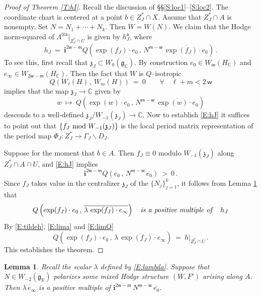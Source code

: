 \documentclass[12pt]{amsart}
\numberwithin{equation}{section}
\numberwithin{table}{section}
\def\sfa{\mathsf{a}}
\def\bC{\mathbb{C}}
\def\fg{\mathfrak{g}}
\def\bi{\mathbf{i}}
\def\sfm{\mathsf{m}}
\def\bR{\mathbb{R}}
\def\sfw{\mathsf{w}}
\def\bs{\backslash}
\def\ot{\otimes}
\newtheorem{lemma}[equation]{Lemma}
\theoremstyle{definition}
\theoremstyle{definition}
\theoremstyle{remark}
\def\bs{\backslash}
\def\fz{\mathfrak{z}}
\begin{document}
\begin{proof}[Proof of Theorem \ref{T:hI}]
Recall the discussion of \S\S\ref{S:loc1}--\ref{S:loc2}.  The coordinate chart is centered at a point $b \in Z_J^* \cap X$.  Assume that $Z_J^* \cap A$ is nonempty.  Set $N = N_1+\cdots+N_k$.  Then $W = W(N)$.  We claim that the Hodge norm-squared of $\Lambda^{\ot \sfa}\big|_{Z_J^* \cap U}$ is given by $h_J^\sfa$, where
\begin{equation}\label{E:hJ}
  h_J \ = \ 
  \bi^{2\sfw-\sfm} Q \left( \exp(f_J) \cdot e_0 \,,\, 
  N^{\sfm-\sfw} \,\overline{\exp(f_J) \cdot e_0} \right) \,.
\end{equation}
To see this, first recall that $\fz_J \subset W_0(\fg_\bC)$.  By construction $e_0 \in W_{\sfm}(H_\bC)$ and $e_\infty \in W_{2\sfw-\sfm}(H_\bC)$.  Then the fact that $W$ is $Q$--isotropic
\begin{equation}\label{E:QW}
  Q \left( W_\ell(H) \,,\, W_m(H) \right) \ = \ 0
  \qquad \forall \quad \ell+m < 2\,\sfw
\end{equation}
implies that the map $\fz_J \to \bC$ given by 
\[
  w \ \mapsto \ 
  Q \left( \exp(w) \cdot e_0 \,,\, 
  N^{\sfm-\sfw}\,\overline{\exp(w) \cdot e_0} \right)
\] 
descends to a well-defined $\fz_J/W_{-1}(\fz_J) \to \bC$.  Now to establish \eqref{E:hJ} it suffices to point out that $\{ f_J \hbox{ mod } W_{-1}(\fz_J) \}$ is the local period matrix representation of the period map $\Phi_J : Z_J^* \to \Gamma_J \bs D_J$.

Suppose for the moment that $b \in A$.  Then $f_J \equiv 0$ modulo $W_{-1}(\fz_J)$ along $Z_J^* \cap A \cap U$, and \eqref{E:hJ} implies
\begin{equation}\label{E:pos1}
  \bi^{2\sfw-\sfm} Q \left( e_0 \,,\, 
  N^{\sfm-\sfw}\,\overline{e_0} \right) \ > \ 0 \,.
\end{equation}
Since $f_J$ takes value in the centralizer $\fz_J$ of the $\{N_j\}_{j=1}^k$, it follows from Lemma \ref{L:hI} that
\begin{equation}\label{E:Q=hJ}
  Q \left( \exp(f_J) \cdot e_0 \,,\, 
  \overline{\lambda\,\exp(f_J) \cdot e_\infty} \right)
  \quad\hbox{\emph{is a positive multiple of}}\quad 
  h_J
\end{equation}
By \eqref{E:tildeh}, \eqref{E:lima} and \eqref{E:limQ}
\[
  Q \left( \exp(f_J) \cdot e_0 \,,\, 
  \overline{\lambda\,\exp(f_J) \cdot e_\infty} \right)
  \ = \ h\big|_{Z_J^* \cap U} \,.
\]
This establishes the theorem.
\end{proof}

\begin{lemma} \label{L:hI}
Recall the scalar $\lambda$ defined by \eqref{E:lambda}.  Suppose that $N \in W_{-2}(\fg_\bR)$ polarizes some mixed Hodge structure $(W,F')$ arising along $A$.  Then $\overline{\lambda \, e_\infty}$ is a positive multiple of $\bi^{2\sfw-\sfm}\, N^{\sfm-\sfw}\, \overline{e_0}$.
\end{lemma}
\end{document}
